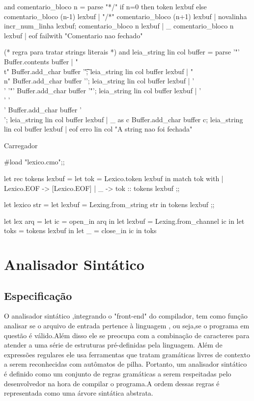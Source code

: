 \documentclass[12pt,a4paper,twoside]{report}
\begin{document}
\begin{terminal}
and comentario_bloco n = parse
    "*/"  { if n=0 then token lexbuf
           else comentario_bloco (n-1) lexbuf }
  | "/*"  { comentario_bloco (n+1) lexbuf }
  | novalinha { incr_num_linha lexbuf; comentario_bloco n lexbuf }
  | _     { comentario_bloco n lexbuf }
  | eof   { failwith "Comentario nao fechado" }

(* regra para tratar strings literais *)
and leia_string lin col buffer = parse
  '"'       { Buffer.contents buffer}
| "\\t"     { Buffer.add_char buffer '\t'; leia_string lin col buffer lexbuf }
| "\\n"     { Buffer.add_char buffer '\n'; leia_string lin col buffer lexbuf }
| '\\' '"'  { Buffer.add_char buffer '"'; leia_string lin col buffer lexbuf }
| '\\' '\\' { Buffer.add_char buffer '\\'; leia_string lin col buffer lexbuf }
| _ as c    { Buffer.add_char buffer c; leia_string lin col buffer lexbuf }
| eof       { erro lin col "A string nao foi fechada"}


\end{terminal}
Carregador
\begin{terminal}
#load "lexico.cmo";;

let rec tokens lexbuf =
  let tok = Lexico.token lexbuf in
  match tok with
  | Lexico.EOF -> [Lexico.EOF]
  | _ -> tok :: tokens lexbuf
;;

let lexico str =
  let lexbuf = Lexing.from_string str in
  tokens lexbuf
;;

let lex arq =
  let ic = open_in arq in
  let lexbuf = Lexing.from_channel ic in
  let toks = tokens lexbuf in
  let _ = close_in ic in
  toks

\end{terminal}
\chapter{Analisador Sintático}

\section{Especificação}
O analisador sintático ,integrando o "front-end" do compilador, tem como função analisar se o arquivo de entrada pertence à linguagem , ou seja,se o programa em questão é válido.Além disso ele se preocupa com a combinação de caracteres para atender a uma série de estruturas pré-definidas pela linguagem.
Além de expressões regulares ele usa ferramentas que tratam gramáticas livres de contexto a serem reconhecidas com autômatos de pilha.
Portanto, um analisador sintático é definido como um conjunto de regras gramáticas a serem respeitadas pelo desenvolvedor na hora de compilar o programa.A ordem dessas regras é representada como uma árvore sintática abstrata.
\end{document}
